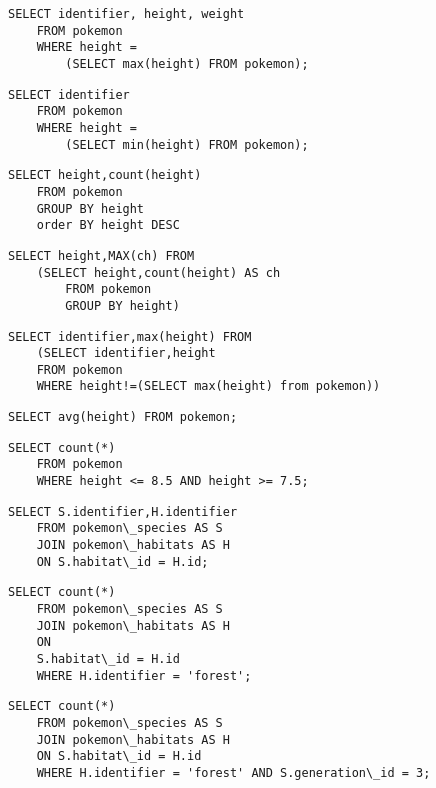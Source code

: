 \question{}
\begin{lstlisting}
SELECT identifier, height, weight
	FROM pokemon 
	WHERE height = 
		(SELECT max(height) FROM pokemon);
\end{lstlisting}


\question{}
\begin{lstlisting}
SELECT identifier
	FROM pokemon 
	WHERE height = 
		(SELECT min(height) FROM pokemon); 
\end{lstlisting}



\question{}
\begin{lstlisting}
SELECT height,count(height) 
	FROM pokemon 
	GROUP BY height
	order BY height DESC
\end{lstlisting}

\question{}
\begin{lstlisting}
SELECT height,MAX(ch) FROM 
	(SELECT height,count(height) AS ch
		FROM pokemon 
		GROUP BY height)
\end{lstlisting}

\question{}
\begin{lstlisting}
SELECT identifier,max(height) FROM 
	(SELECT identifier,height 
	FROM pokemon 
	WHERE height!=(SELECT max(height) from pokemon))
\end{lstlisting}



\question{}%
\begin{lstlisting}
SELECT avg(height) FROM pokemon;
\end{lstlisting}
 
\question{}
\begin{lstlisting}
SELECT count(*) 
	FROM pokemon 
	WHERE height <= 8.5 AND height >= 7.5;
\end{lstlisting}

\question{}
\begin{lstlisting}
SELECT S.identifier,H.identifier 
	FROM pokemon\_species AS S 
	JOIN pokemon\_habitats AS H 
	ON S.habitat\_id = H.id;
\end{lstlisting}

\question{}
\begin{lstlisting}
SELECT count(*) 
	FROM pokemon\_species AS S 
	JOIN pokemon\_habitats AS H 
	ON 
	S.habitat\_id = H.id 
	WHERE H.identifier = 'forest';
\end{lstlisting}  

\question{}
\begin{lstlisting}
SELECT count(*) 
	FROM pokemon\_species AS S 
	JOIN pokemon\_habitats AS H 
	ON S.habitat\_id = H.id 
	WHERE H.identifier = 'forest' AND S.generation\_id = 3;
\end{lstlisting} 


